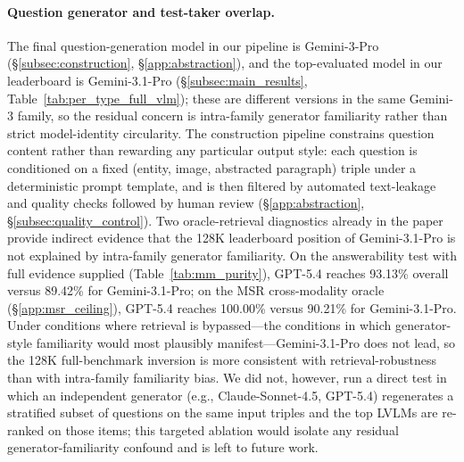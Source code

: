 \documentclass{article}
\begin{document}
\paragraph{Question generator and test-taker overlap.}
The final question-generation model in our pipeline is Gemini-3-Pro (\S\ref{subsec:construction}, \S\ref{app:abstraction}), and the top-evaluated model in our leaderboard is Gemini-3.1-Pro (\S\ref{subsec:main_results}, Table~\ref{tab:per_type_full_vlm}); these are different versions in the same Gemini-3 family, so the residual concern is intra-family generator familiarity rather than strict model-identity circularity. The construction pipeline constrains question content rather than rewarding any particular output style: each question is conditioned on a fixed (entity, image, abstracted paragraph) triple under a deterministic prompt template, and is then filtered by automated text-leakage and quality checks followed by human review (\S\ref{app:abstraction}, \S\ref{subsec:quality_control}). Two oracle-retrieval diagnostics already in the paper provide indirect evidence that the 128K leaderboard position of Gemini-3.1-Pro is not explained by intra-family generator familiarity. On the answerability test with full evidence supplied (Table~\ref{tab:mm_purity}), GPT-5.4 reaches 93.13\% overall versus 89.42\% for Gemini-3.1-Pro; on the MSR cross-modality oracle (\S\ref{app:msr_ceiling}), GPT-5.4 reaches 100.00\% versus 90.21\% for Gemini-3.1-Pro. Under conditions where retrieval is bypassed---the conditions in which generator-style familiarity would most plausibly manifest---Gemini-3.1-Pro does not lead, so the 128K full-benchmark inversion is more consistent with retrieval-robustness than with intra-family familiarity bias. We did not, however, run a direct test in which an independent generator (e.g., Claude-Sonnet-4.5, GPT-5.4) regenerates a stratified subset of questions on the same input triples and the top LVLMs are re-ranked on those items; this targeted ablation would isolate any residual generator-familiarity confound and is left to future work.
\end{document}
